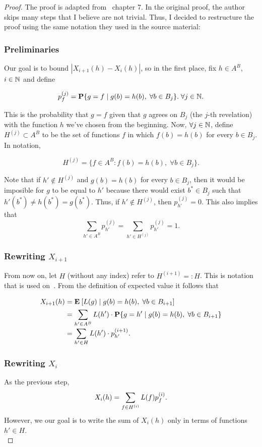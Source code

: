 \begin{proof} The proof is adapted from~\cite{alon2016probabilistic} chapter 7. In the original proof, the author skips many steps that I believe are not trivial. Thus, I decided to restructure the proof using the same notation they used in the source material:

\subsubsection*{Preliminaries}
Our goal is to bound $|X_{i+1}(h) - X_{i}(h)|$, so in the first place, fix $h \in A^B$, $i\in \mathbb{N}$ and define

\[ p_{f}^{(j)} = \mathbf{P}\{g = f \;|\; g(b) = h(b),\; \forall b \in B_{j}\}.\; \forall j\in \mathbb{N}. \]

This is the probability that $g = f$ given that $g$ agrees on $B_j$ (the $j$-th revelation) with the function $h$ we've chosen from the beginning. Now, $\forall j\in \mathbb{N}$, define $H^{(j)}\subset A^B$ to be the set of functions $f$ in which $f(b) = h(b)$ for every $b \in B_{j}$. In notation,

\[ H^{(j)} = \{f \in A^B: f(b) = h(b),\; \forall b \in B_j\}. \] 

Note that if $h' \not\in H^{(j)}$ and $g(b) = h(b)$ for every $b\in B_{j}$, then it would be imposible for $g$ to be equal to $h'$ because there would exist $b^* \in B_{j}$ such that $h'(b^*) \neq h(b^*) = g(b^*)$. Thus, if $h' \not\in H^{(j)}$, then $p_{h'}^{(j)} = 0$. This also implies that 
\[\sum_{h' \in A^B} p_{h'}^{(j)} = \sum_{h' \in H^{(j)}} p_{h'}^{(j)} = 1. \] 

\subsubsection*{Rewriting $X_{i+1}$}
From now on, let $H$ (without any index) refer to $H^{(i+1)} =: H$. This is notation that is used on~\cite{alon2016probabilistic}. From the definition of expected value it follows that
\[\everymath{\displaystyle}\arraycolsep=1.4pt\def\arraystretch{1.5}
    \begin{array}{rcl}
    X_{i+1}(h) & = & \E[ L(g) \;|\; g(b) = h(b),\; \forall b\in B_{i+1} ] \\ 
    & = & \sum_{h' \in A^B} L(h') \cdot \P\{g = h' \;|\; g(b) = h(b),\; \forall b \in B_{i+1}\}\\
    & = & \sum_{h' \in H} L(h') \cdot p_{h'}^{(i+1)}.
\end{array}\]


\subsubsection*{Rewriting $X_i$}
As the previous step,
\[\everymath{\displaystyle}\arraycolsep=1.4pt\def\arraystretch{1.5}
    \begin{array}{rcl}
    X_{i}(h) & = & \sum_{f\in H^{(i)}} L(f) p_{f}^{(i)}.
\end{array}\]
However, we our goal is to write the sum of $X_{i}(h)$ only in terms of functions $h' \in H$.\\[1em]


\end{proof}
